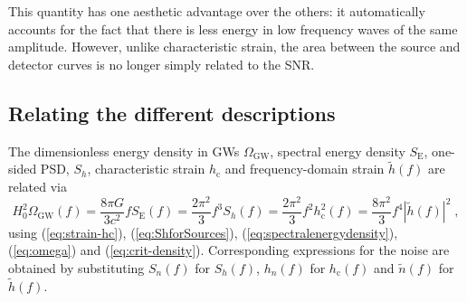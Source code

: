 This quantity has one aesthetic advantage over the others: it automatically accounts for the fact that there is less energy in low frequency waves of the same amplitude. However, unlike characteristic strain, the area between the source and detector curves is no longer simply related to the SNR.

\subsection{Relating the different descriptions}
The dimensionless energy density in GWs $\Omega_{\mathrm{GW}}$, spectral energy density $S_{\mathrm{E}}$, one-sided PSD, $S_{h}$, characteristic strain $h_\mathrm{c}$ and frequency-domain strain $\tilde{h}(f)$ are related via
\begin{equation}\label{eq:differentdescriptions}
H_0^2\Omega_\mathrm{GW}(f)= \frac{8 \pi G}{3 c^{2}} fS_{\mathrm{E}}(f) = \frac{2\pi^2}{3} f^3 S_h(f) = \frac{2\pi^2}{3} f^2 h_\mathrm{c}^2(f) = \frac{8\pi^2}{3} f^4 \left|\tilde{h}(f)\right|^2\; ,
\end{equation}
using (\ref{eq:strain-hc}), (\ref{eq:ShforSources}), (\ref{eq:spectralenergydensity}), (\ref{eq:omega}) and (\ref{eq:crit-density}).
Corresponding expressions for the noise are obtained by substituting $S_{n}(f)$ for $S_h(f)$, $h_{n}(f)$ for $h_\mathrm{c}(f)$ and $\tilde{n}(f)$ for $\tilde{h}(f)$. 

